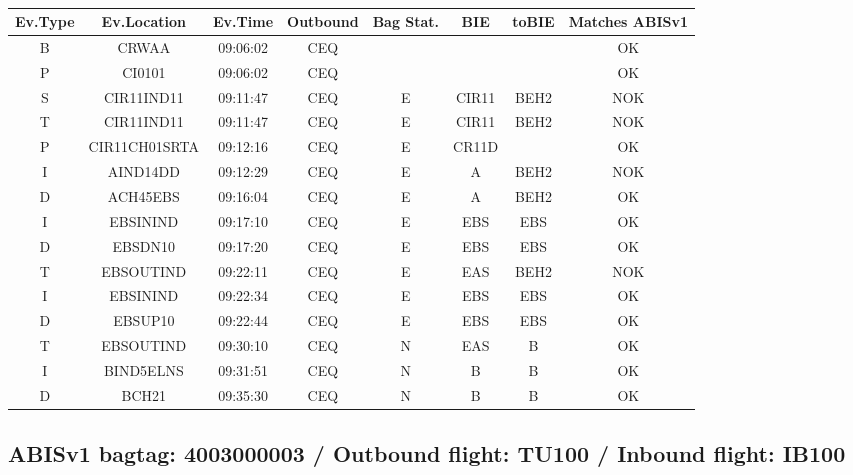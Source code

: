\documentclass{report}
\begin{document}
\paragraph{}
\begin{longtable}{cccccccc}    \toprule
\rowcolor{white!50}
\textbf{Ev.Type} & \textbf{Ev.Location} & \textbf{Ev.Time} & \textbf{Outbound} & \textbf{Bag Stat.} & \textbf{BIE} & \textbf{toBIE} & \textbf{Matches ABISv1} \\\midrule
B & CRWAA & 09:06:02  & CEQ &  &  &  & OK\\
P & CI0101 & 09:06:02  & CEQ &  &  &  & OK\\
S & CIR11IND11 & 09:11:47  & CEQ & E & CIR11 & BEH2 & NOK\\
T & CIR11IND11 & 09:11:47  & CEQ & E & CIR11 & BEH2 & NOK\\
P & CIR11CH01SRTA & 09:12:16  & CEQ & E & CR11D &  & OK\\
I & AIND14DD & 09:12:29  & CEQ & E & A & BEH2 & NOK\\
D & ACH45EBS & 09:16:04  & CEQ & E & A & BEH2 & OK\\
I & EBSININD & 09:17:10  & CEQ & E & EBS & EBS & OK\\
D & EBSDN10 & 09:17:20  & CEQ & E & EBS & EBS & OK\\
T & EBSOUTIND & 09:22:11  & CEQ & E & EAS & BEH2 & NOK\\
I & EBSININD & 09:22:34  & CEQ & E & EBS & EBS & OK\\
D & EBSUP10 & 09:22:44  & CEQ & E & EBS & EBS & OK\\
T & EBSOUTIND & 09:30:10  & CEQ & N & EAS & B & OK\\
I & BIND5ELNS & 09:31:51  & CEQ & N & B & B & OK\\
D & BCH21 & 09:35:30  & CEQ & N & B & B & OK\\
\bottomrule
\end{longtable}
\subsection*{ABISv1 bagtag: 4003000003 / Outbound flight: TU100 / Inbound flight: IB100}
\end{document}

